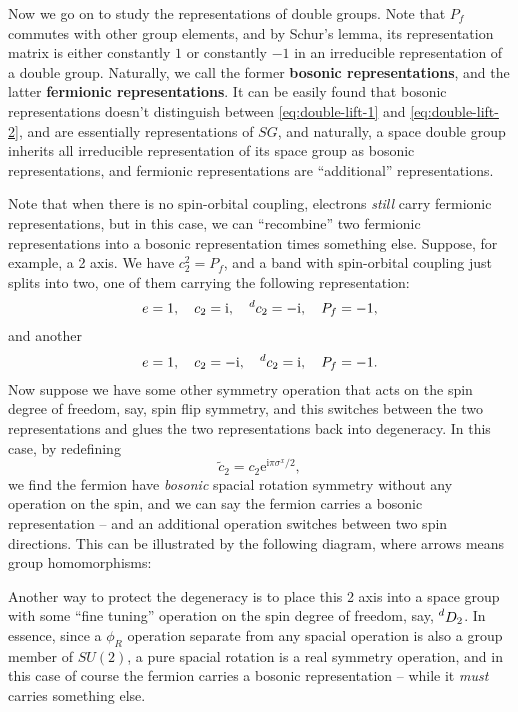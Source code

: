 \documentclass[hyperref, a4paper]{article}
\newcommand*{\ii}{\mathrm{i}}
\newcommand*{\ee}{\mathrm{e}}
\newcommand*{\concept}[1]{{\textbf{#1}}}
\begin{document}
Now we go on to study the representations of double groups. Note that $P_f$ commutes with other group elements,
and by Schur's lemma, its representation matrix is either constantly $1$ or constantly $-1$ in an irreducible representation 
of a double group. Naturally, we call the former \concept{bosonic representations}, and the latter \concept{fermionic representations}.
It can be easily found that bosonic representations doesn't distinguish between \eqref{eq:double-lift-1} 
and \eqref{eq:double-lift-2}, and are essentially representations of $SG$, and naturally, a space double 
group inherits all irreducible representation of its space group as bosonic representations, and 
fermionic representations are ``additional'' representations. 

Note that when there is no spin-orbital coupling, electrons \emph{still} carry fermionic representations,
but in this case, we can ``recombine'' two fermionic representations into a bosonic representation times something else.
Suppose, for example, a 2 axis. We have $c_2^2 = P_f$, and a band with spin-orbital coupling just splits 
into two, one of them carrying the following representation:
\[
    e = 1, \quad c_2 = \ii, \quad \prescript{d}{}{c_2} = - \ii, \quad P_f = -1,
\]
and another 
\[
    e = 1, \quad c_2 = - \ii, \quad \prescript{d}{}{c_2} = \ii, \quad P_f = -1.
\]
Now suppose we have some other symmetry operation that acts on the spin degree of freedom, say,
spin flip symmetry, and this switches between the two representations and glues the two representations back into degeneracy. 
In this case, by redefining 
\begin{equation}
    \tilde{c}_2 = c_2 \ee^{\ii \pi \sigma^x / 2},
\end{equation}
we find the fermion have \emph{bosonic} spacial rotation symmetry without any operation on the spin,
and we can say the fermion carries a bosonic representation -- and an additional operation switches between two spin directions.
This can be illustrated by the following diagram, where arrows means group homomorphisms:

Another way to protect the degeneracy is to place this 2 axis into a space group with some ``fine tuning'' 
operation on the spin degree of freedom, say, $\prescript{d}{}{D_2}$.
In essence, since a $\phi_R$ operation separate from any spacial operation is also a group member of $SU(2)$,
a pure spacial rotation is a real symmetry operation, and in this case of course the fermion carries 
a bosonic representation -- while it \emph{must} carries something else.
\end{document}
